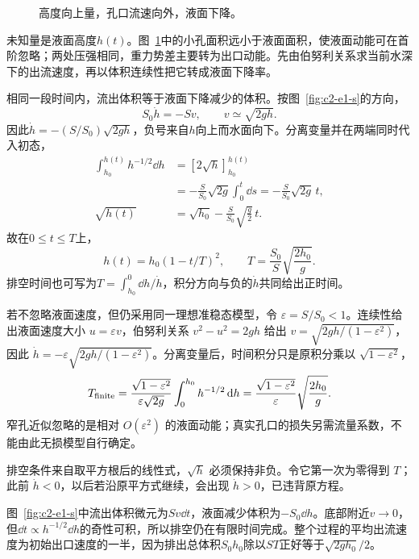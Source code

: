 \begin{figure}[H]\centering
{}
\caption{高度向上量，孔口流速向外，液面下降。}\label{fig:c2-e1-q}
\end{figure}
\begin{solution}
未知量是液面高度$h(t)$。图~\ref{fig:c2-e1-q}中的小孔面积远小于液面面积，使液面动能可在首阶忽略；两处压强相同，重力势差主要转为出口动能。先由伯努利关系求当前水深下的出流速度，再以体积连续性把它转成液面下降率。


相同一段时间内，流出体积等于液面下降减少的体积。按图~\ref{fig:c2-e1-s}的方向，
\[S_0\dot h=-Sv,\qquad v\simeq\sqrt{2gh}.
\]
因此$\dot h=-(S/S_0)\sqrt{2gh}$，负号来自$h$向上而水面向下。分离变量并在两端同时代入初态，
\begin{align*}
\int_{h_0}^{h(t)}h^{-1/2}\dd h
&=[2\sqrt h]_{h_0}^{h(t)}\\
&=-\frac S{S_0}\sqrt{2g}\int_0^t\dd s
=-\frac S{S_0}\sqrt{2g}\,t,\\
\sqrt{h(t)}&=\sqrt{h_0}-\frac S{S_0}\sqrt{\frac g2}\,t.
\end{align*}
故在$0\le t\le T$上，
\[\boxed{h(t)=h_0(1-t/T)^2,\qquad
T=\frac{S_0}{S}\sqrt{\frac{2h_0}g}}.
\]
排空时间也可写为$T=\int_{h_0}^{0}\dd h/\dot h$，积分方向与负的$\dot h$共同给出正时间。

若不忽略液面速度，但仍采用同一理想准稳态模型，令 $\varepsilon=S/S_0<1$。连续性给出液面速度大小 $u=\varepsilon v$，伯努利关系 $v^2-u^2=2gh$ 给出 $v=\sqrt{2gh/(1-\varepsilon^2)}$，因此 $\dot h=-\varepsilon\sqrt{2gh/(1-\varepsilon^2)}$。分离变量后，时间积分只是原积分乘以 $\sqrt{1-\varepsilon^2}$，
\[
T_{\rm finite}=\frac{\sqrt{1-\varepsilon^2}}{\varepsilon\sqrt{2g}}
\int_0^{h_0}h^{-1/2}\mathop{}\!\mathrm d h
=\frac{\sqrt{1-\varepsilon^2}}{\varepsilon}\sqrt{\frac{2h_0}{g}}.
\]
窄孔近似忽略的是相对 $O(\varepsilon^2)$ 的液面动能；真实孔口的损失另需流量系数，不能由此无损模型自行确定。


排空条件来自取平方根后的线性式，$\sqrt h$ 必须保持非负。令它第一次为零得到 $T$；此前 $\dot h<0$，以后若沿原平方式继续，会出现 $\dot h>0$，已违背原方程。

图~\ref{fig:c2-e1-s}中流出体积微元为$Sv\dd t$，液面减少体积为$-S_0\dd h$。底部附近$v\to0$，但$\dd t\propto h^{-1/2}\dd h$的奇性可积，所以排空仍在有限时间完成。整个过程的平均出流速度为初始出口速度的一半，因为排出总体积$S_0h_0$除以$ST$正好等于$\sqrt{2gh_0}/2$。


\end{solution}
